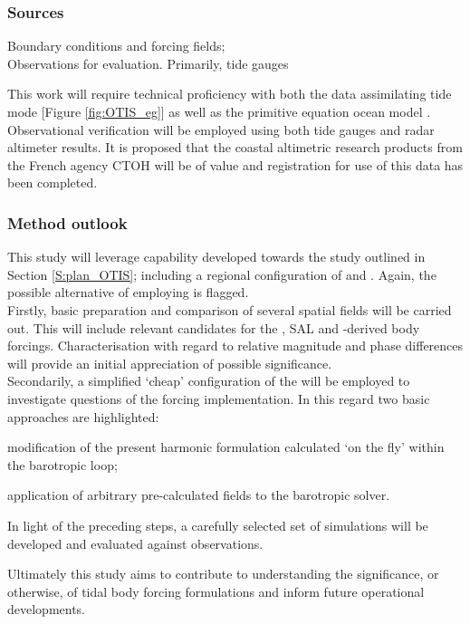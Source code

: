 \subsubsection{Sources}
Boundary conditions and forcing fields; \\
Observations for evaluation.   Primarily, tide gauges

This work will require technical proficiency with both the data assimilating tide mode \OTIS{} [Figure \ref{fig:OTIS_eg}] as well as the primitive equation ocean model \MOM{}.\\
Observational verification will be employed using both tide gauges and radar altimeter results.  It is proposed that the coastal altimetric research products from the French agency CTOH will be of value and registration for use of this data has been completed.


\subsubsection{Method outlook}
This study will leverage capability developed towards the study outlined in Section \ref{S:plan_OTIS}; including a regional configuration of \OTIS{} and \MOM{}.  Again, the possible alternative of employing \ROMS{} is flagged.\\



Firstly, basic preparation and comparison of several spatial fields will be carried out.   This will include relevant candidates for the  \ATGP{}, SAL and \OTIS{}-derived body forcings.   Characterisation with regard to relative magnitude and phase differences will provide an initial appreciation of possible significance.\\



Secondarily, a simplified `cheap' configuration of the \OGCM{} will be employed to investigate questions of the forcing implementation.   
In this regard two basic approaches are highlighted:
\begin{inparaenum}[(a)]
\item modification of the present harmonic formulation calculated `on the fly' within the barotropic loop;
\item application of arbitrary pre-calculated fields to the barotropic solver.
\end{inparaenum}


In light of the preceding steps, a carefully selected set of \OGCM{} simulations will be developed and evaluated against observations. 



Ultimately this study aims to contribute to understanding the significance, or otherwise, of tidal body forcing formulations and inform future operational developments. 




